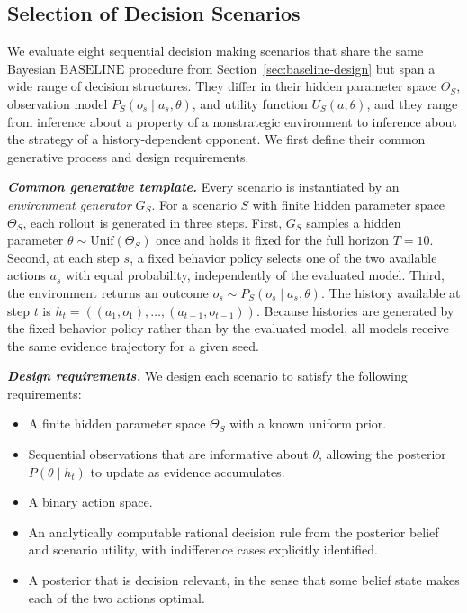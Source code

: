 \subsection{Selection of Decision Scenarios}
\label{sec:scenarios}

We evaluate eight sequential decision making scenarios that share the
same Bayesian \(\mathrm{BASELINE}\) procedure from
Section~\ref{sec:baseline-design} but span a wide range of decision
structures. They differ in their hidden parameter space \(\Theta_S\),
observation model \(P_S(o_s\mid a_s,\theta)\), and utility function
\(U_S(a,\theta)\), and they range from inference about a property of a
nonstrategic environment to inference about the strategy of a
history-dependent opponent. We first define their common generative
process and design requirements.

\textbf{\textit{Common generative template.}}
Every scenario is instantiated by an \emph{environment generator} \(G_S\).
For a scenario \(S\) with finite hidden parameter space \(\Theta_S\), each
rollout is generated in three steps. First, \(G_S\) samples a hidden
parameter \(\theta\sim\mathrm{Unif}(\Theta_S)\) once and holds it fixed for
the full horizon \(T=10\). Second, at each step \(s\), a fixed behavior policy
selects one of the two available actions \(a_s\) with equal probability,
independently of the evaluated model. Third, the environment returns an
outcome \(o_s\sim P_S(o_s\mid a_s,\theta)\). The history available at step
\(t\) is \(h_t=((a_1,o_1),\ldots,(a_{t-1},o_{t-1}))\). Because histories
are generated by the fixed behavior policy rather than by the evaluated
model, all models receive the same evidence trajectory for a given seed.

\textbf{\textit{Design requirements.}}
We design each scenario to satisfy the following requirements:

\begin{itemize}
    \item[(C1)] A finite hidden parameter space
    \(\Theta_S\) with a known uniform prior.

    \item[(C2)] Sequential observations that are informative about
    \(\theta\), allowing the posterior \(P(\theta\mid h_t)\) to update as
    evidence accumulates.

    \item[(C3)] A binary action space.

    \item[(C4)] An analytically computable rational decision rule from the
    posterior belief and scenario utility, with indifference cases
    explicitly identified.

    \item[(C5)] A posterior that is decision relevant, in the sense that
    some belief state makes each of the two actions optimal.
\end{itemize}

